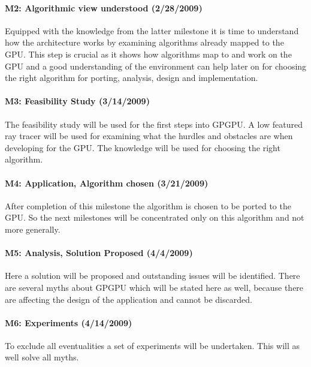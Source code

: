 \paragraph{M2: Algorithmic view understood (2/28/2009)} %
\label{par:m2_architecture_algorithmic_view_understood}
Equipped with the knowledge from the latter milestone it is time to understand
how the architecture works by examining algorithms already mapped to the GPU.
This step is crucial as it shows how algorithms map to and work on the \gls{GPU}
and a good understanding of the environment can help later on for choosing the
right algorithm for porting, analysis, design and implementation.
\paragraph{M3: Feasibility Study (3/14/2009)} %
\label{par:m3_feasibility_study}
The feasibility study will be used for the first steps into GPGPU. A low featured
ray tracer will be used for examining what the hurdles and obstacles are when 
developing for the GPU. The knowledge will be used for choosing the right 
algorithm. 
\paragraph{M4: Application, Algorithm chosen (3/21/2009)} %
\label{par:m4_application_algorithm_choosen}
After completion of this milestone the algorithm is chosen to be ported to the 
GPU. So the next milestones will be concentrated only on this algorithm and not 
more generally. 
\paragraph{M5: Analysis, Solution Proposed (4/4/2009)} %
\label{par:m5_analysis_solution_proposed}
Here a solution will be proposed and outstanding issues will be identified. 
There are several myths about GPGPU which will be stated here as well, because 
there are affecting the design of the application and cannot be discarded.
\paragraph{M6: Experiments (4/14/2009)} %
\label{par:m6_experiments}
To exclude all eventualities a set of experiments will be undertaken. This will 
as well solve all myths.

